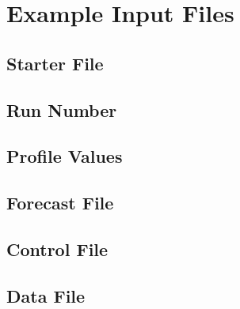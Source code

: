 \section{Example Input Files}

\subsection{Starter File}

\subsection{Run Number}

\subsection{Profile Values}

\subsection{Forecast File}

\subsection{Control File}

\subsection{Data File}
